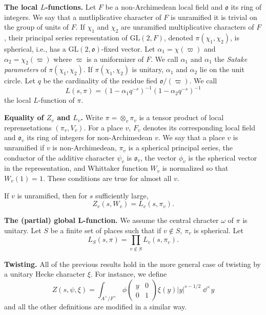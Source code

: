 \documentclass[12pt, letterpaper, twoside]
{article}
\newcommand{\dd}[1]{\mathrm{d}#1} %
\newcommand{\GL}{{\text{GL}}} %
\newcommand{\oI}{\mathfrak{o}} %
\begin{document}
\textbf{The local $L$-functions.} Let $F$ be a non-Archimedean local field and
$\oI$ its ring of integers. We say that a mutliplicative character of $F$ is
unramified it is trivial on the group of units of $F$. If $\chi_1$ and $\chi_2$
are unramified multiplicative characters of $F$, their principal series
representation of $\GL(2, F)$, denoted $\pi(\chi_1, \chi_2)$, is spherical,
i.e., has a $\GL(2, \oI)$-fixed vector. Let $\alpha_1 = \chi(\varpi)$ and
$\alpha_2 = \chi_2(\varpi)$ where $\varpi$ is a uniformizer of $F$. We call
$\alpha_1$ and $\alpha_1$ the \textit{Satake parameters} of $\pi(\chi_1,
\chi_2)$. If $\pi(\chi_1, \chi_2)$ is unitary, $\alpha_1$ and $\alpha_2$ lie on
the unit circle. Let $q$ be the cardinality of the residue fied $\oI/(\varpi)$.
We call
\[L(s, \pi) = (1 - \alpha_1q^{-s})^{-1}(1 - \alpha_2q^{-s})^{-1}\] the local
$L$-function of $\pi$.

\textbf{Equality of $Z_v$ and $L_v$.} Write $\pi = \otimes_v \pi_v$ is a tensor
product of local reprensetations $(\pi_v, V_v)$. For a place $v$, $F_v$ denotes
its corresponding local field and $\oI_v$ its ring of integers for
non-Archimedean $v$. We say that a place $v$ is unramified if $v$ is
non-Archimedean, $\pi_v$ is a spherical principal series, the conductor of the
additive character $\psi_v$ is $\oI_v$, the vector $\phi_v$ is the spherical
vector in the representation, and Whittaker function $W_v$ is normalized so that
$W_v(1) = 1$. These conditions are true for almost all $v$. 

If $v$ is unramified, then for $s$ sufficiently large,
\[Z_v(s, W_v) = L_v(s, \pi_v).\]

\textbf{The (partial) global L-function.} We assume the central chracter
$\omega$ of $\pi$ is unitary. Let $S$ be a finite set of places such that if $v
\not\in S$, $\pi_v$ is spherical. Let
\[L_S(s, \pi) = \prod_{v \not\in S} L_v(s, \pi_v).\]

\textbf{Twisting.} All of the previous results hold in the more general case of
twisting by a unitary Hecke character $\xi$. For instance, we define
\[Z(s, \psi, \xi) = \int_{A^\times/F^\times} \phi \begin{pmatrix} y & 0 \\ 0 & 1
\end{pmatrix}\xi(y)|y|^{s - 1/2} \; \dd^\times y\] and all the other definitions
are modified in a similar way.
\end{document}
